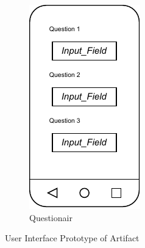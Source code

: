 \begin{figure}
\begin{subfigure}[b]{0.25\textwidth}
    \end{subfigure}
    \hspace{1cm}
    \begin{subfigure}[b]{0.25\textwidth}
        \centering
        \includegraphics[width=\textwidth]{content/05_design_and_dev_artefacts/ActivityQuestionair.drawio.pdf}
        \caption{ Questionair}
        \label{subfig:Questionair}

    \end{subfigure}
       \caption{User Interface Prototype of Artifact}
       \label{fig:uiPrototypeArtefact}
\end{figure}

